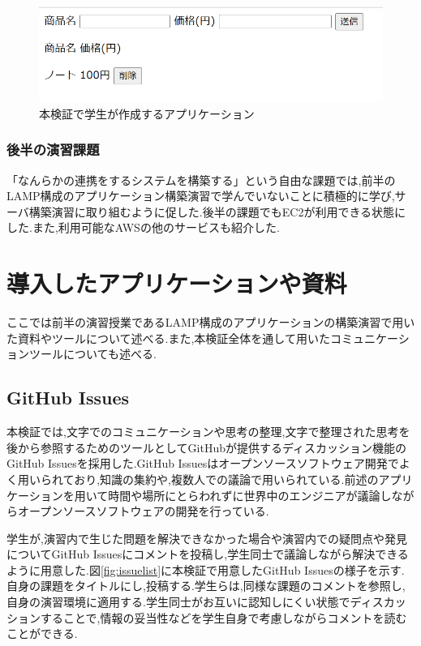 \documentclass[11pt, a4paper]{jreport}
\begin{document}
\begin{figure}[H]
\begin{center}
\includegraphics[width=120mm]{./img/phpapp.png}
\caption{本検証で学生が作成するアプリケーション}
\label{fig:phpapp}
\end{center}
\end{figure}

\subsubsection{後半の演習課題}

「なんらかの連携をするシステムを構築する」という自由な課題では,前半のLAMP構成のアプリケーション構築演習で学んでいないことに積極的に学び,サーバ構築演習に取り組むように促した.後半の課題でもEC2が利用できる状態にした.また,利用可能なAWSの他のサービスも紹介した.

\section{導入したアプリケーションや資料}

ここでは前半の演習授業であるLAMP構成のアプリケーションの構築演習で用いた資料やツールについて述べる.また,本検証全体を通して用いたコミュニケーションツールについても述べる.

\subsection{GitHub Issues}\label{GHIssue}

本検証では,文字でのコミュニケーションや思考の整理,文字で整理された思考を後から参照するためのツールとしてGitHubが提供するディスカッション機能のGitHub Issuesを採用した.GitHub Issuesはオープンソースソフトウェア開発でよく用いられており,知識の集約や,複数人での議論で用いられている.前述のアプリケーションを用いて時間や場所にとらわれずに世界中のエンジニアが議論しながらオープンソースソフトウェアの開発を行っている.

学生が,演習内で生じた問題を解決できなかった場合や演習内での疑問点や発見についてGitHub Issuesにコメントを投稿し,学生同士で議論しながら解決できるように用意した.図\ref{fig:issuelist}に本検証で用意したGitHub Issuesの様子を示す\cite{bib:ghissue}.自身の課題をタイトルにし,投稿する.学生らは,同様な課題のコメントを参照し,自身の演習環境に適用する.学生同士がお互いに認知しにくい状態でディスカッションすることで,情報の妥当性などを学生自身で考慮しながらコメントを読むことができる.
\end{document}
